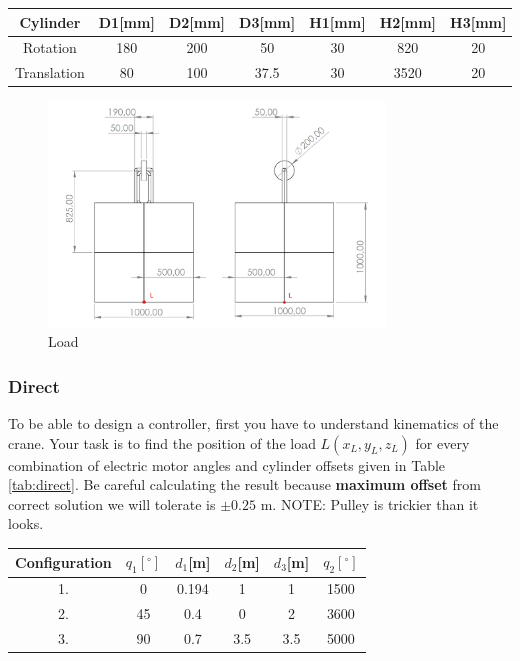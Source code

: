 \documentclass[openany]{book}
\begin{document}
	\begin{center}
		\label{tab:cylinder_tab}
		\begin{tabular}{||c|| c c c || c c c ||}
			\hline
			Cylinder & D1[mm] & D2[mm] &  D3[mm] & H1[mm] & H2[mm] & H3[mm] \\
			\hline\hline
			Rotation & 180 & 200 & 50 & 30 & 820 & 20\\ 
			\hline
			Translation & 80 & 100 & 37.5 & 30 & 3520 & 20 \\
			\hline
		\end{tabular}
	\end{center}
	
	\begin{figure}[h!]
		\centering
		\includegraphics[width=0.8\textwidth]{teret.jpg}
		\caption{Load}
		\label{fig:load}
	\end{figure}
	
	\subsubsection{Direct}
	
	To be able to design a controller, first you have to understand  kinematics 
	of the crane. Your task is to find the position of the load 
	$L(x_L,y_L,z_L)$ for every combination of electric motor angles and 
	cylinder offsets given in Table \ref{tab:direct}. Be careful calculating 
	the result because \textbf{maximum offset} from correct solution we will 
	tolerate is $\pm 0.25$ m.
	\noindent NOTE: Pulley is trickier than it looks.
	
	
	\begin{center}
		\label{tab:direct}
		\begin{tabular}{|| c || c c c c c ||}
			\hline
			Configuration & $q_1[^{\circ}]$ & $d_1$[m] & $d_2$[m] & $d_3$[m] &  
			$q_2[^{\circ}]$\\
			\hline\hline
			1. & 0 & 0.194 & 1 & 1 & 1500 \\ 
			\hline
			2. & 45 & 0.4 & 0 & 2 & 3600 \\
			\hline
			3. & 90 & 0.7 & 3.5  & 3.5 & 5000 \\
			\hline
		\end{tabular}
	\end{center}
	
\end{document}
